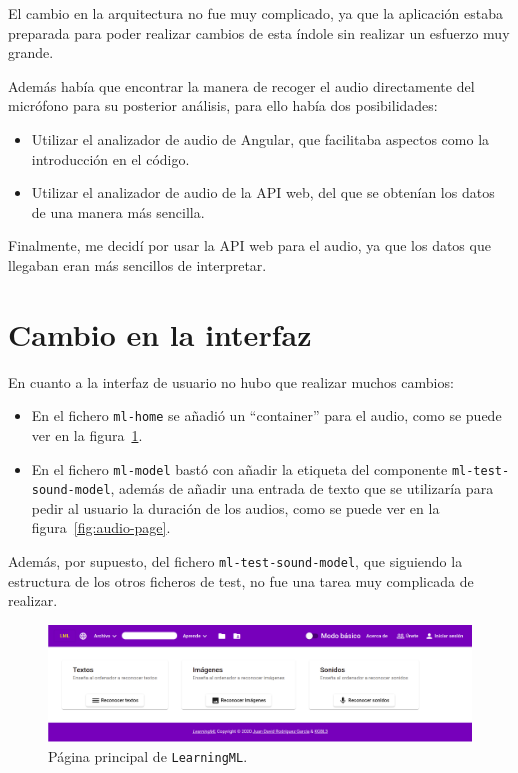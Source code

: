 \documentclass[a4paper, 12pt]{book}
\begin{document}
El cambio en la arquitectura no fue muy complicado, ya que la aplicación estaba preparada para poder realizar cambios de esta índole sin realizar un esfuerzo muy grande.

Además había que encontrar la manera de recoger el audio directamente del micrófono para su posterior análisis, para ello había dos posibilidades:
\begin{itemize}
	\item Utilizar el analizador de audio de Angular, que facilitaba aspectos como la introducción en el código.
	\item Utilizar el analizador de audio de la API web, del que se obtenían los datos de una manera más sencilla.
\end{itemize}

Finalmente, me decidí por usar la API web para el audio, ya que los datos que llegaban eran más sencillos de interpretar.

\section{Cambio en la interfaz}
\label{sec:cambio-interfaz}

En cuanto a la interfaz de usuario no hubo que realizar muchos cambios:
\begin{itemize}
	\item En el fichero \texttt{ml-home} se añadió un ``container'' para el audio, como se puede ver en la figura~\ref{fig:main-page}.
	\item En el fichero \texttt{ml-model} bastó con añadir la etiqueta del componente \texttt{ml-test-sound-model}, además de añadir una entrada de texto que se utilizaría para pedir al usuario la duración de los audios, como se puede ver en la figura~\ref{fig:audio-page}.
\end{itemize}

Además, por supuesto, del fichero \texttt{ml-test-sound-model}, que siguiendo la estructura de los otros ficheros de test, no fue una tarea muy complicada de realizar.

\begin{figure}
	\centering
	\includegraphics[width=12cm, keepaspectratio]{img/pagina-principal.png}
	\caption{Página principal de \texttt{LearningML}.}\label{fig:main-page}
\end{figure}
\end{document}
